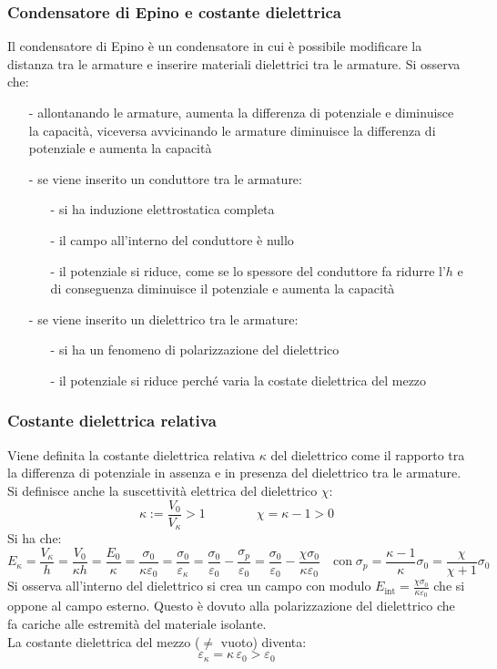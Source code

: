 \documentclass[a4paper]{article}
\begin{document}
\subsubsection*{Condensatore di Epino e costante dielettrica}
Il condensatore di Epino è un condensatore in cui è possibile modificare la distanza tra le armature e inserire materiali
dielettrici tra le armature. Si osserva che:
\begin{itemize}[topsep=3pt, itemsep=0pt]
	\item[-] allontanando le armature, aumenta la differenza di potenziale e diminuisce la capacità, viceversa avvicinando le
	armature diminuisce la differenza di potenziale e aumenta la capacità
	\item[-] se viene inserito un conduttore tra le armature:
	\begin{itemize}[topsep=0pt, itemsep=0pt]
		\item[-] si ha induzione elettrostatica completa
		\item[-] il campo all'interno del conduttore è nullo
		\item[-] il potenziale si riduce, come se lo spessore del conduttore fa ridurre l'\(h\) e di conseguenza diminuisce
		il potenziale e aumenta la capacità
	\end{itemize}
	\item[-] se viene inserito un dielettrico tra le armature:
	\begin{itemize}[topsep=0pt, itemsep=0pt]
		\item[-] si ha un fenomeno di polarizzazione del dielettrico
		\item[-] il potenziale si riduce perché varia la costate dielettrica del mezzo
	\end{itemize}
\end{itemize}

\subsubsection*{Costante dielettrica relativa}
Viene definita la costante dielettrica relativa \(\kappa\) del dielettrico come il rapporto tra la differenza di potenziale in
assenza e  in presenza del dielettrico tra le armature. Si definisce anche la suscettività elettrica del dielettrico \(\chi\):
\[\kappa := \frac{V_0}{V_\kappa} > 1 \qquad \qquad \chi = \kappa - 1 > 0\]
Si ha che:
\[E_\kappa = \frac{V_\kappa}{h} = \frac{V_0}{\kappa h} = \frac{E_0}{\kappa} = \frac{\sigma_0}{\kappa \varepsilon_0} = \frac{\sigma_0}{\varepsilon_\kappa} = \frac{\sigma_0}{\varepsilon_0} - \frac{\sigma_p}{\varepsilon_0} = \frac{\sigma_0}{\varepsilon_0} - \frac{\chi \sigma_0}{\kappa \varepsilon_0} \quad
\text{con} \; \sigma_p = \frac{\kappa-1}{\kappa} \sigma_0 = \frac{\chi}{\chi+1}\sigma_0\]
Si osserva all'interno del dielettrico si crea un campo con modulo \(\displaystyle E_\text{int} = \frac{\chi \sigma_0}{\kappa \varepsilon_0}\)
che si oppone al campo esterno. Questo è dovuto alla polarizzazione del dielettrico che fa  cariche alle estremità
del materiale isolante. \\[10pt]
La costante dielettrica del mezzo (\(\neq\) vuoto) diventa: \[\varepsilon_\kappa = \kappa \,  \varepsilon_0 > \varepsilon_0\]
\end{document}

